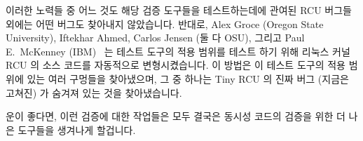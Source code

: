 이러한 노력들 중 어느 것도 해당 검증 도구들을 테스트하는데에 관여된 RCU 버그들
외에는 어떤 버그도 찾아내지 않았습니다.
반대로,
Alex Groce (Oregon State University), Iftekhar Ahmed, Carlos Jensen
(둘 다 OSU), 그리고 Paul E.~McKenney
(IBM)~\cite{Groce:2015:VMC:2916135.2916190}
는  테스트 도구의 적용 범위를 테스트 하기 위해 리눅스 커널 RCU
의 소스 코드를 자동적으로 변형시켰습니다.
이 방법은 이 테스트 도구의 적용 범위에 있는 여러 구멍들을 찾아냈으며, 그 중
하나는 Tiny RCU 의 진짜 버그 (지금은 고쳐진) 가 숨겨져 있는 것을 찾아냈습니다.

운이 좋다면, 이런 검증에 대한 작업들은 모두 결국은 동시성 코드의 검증을 위한 더
나은 도구들을 생겨나게 할겁니다.
\iffalse

None of these efforts located any bugs other than bugs injected into
RCU specifically to test the verification tools.
In contrast,
Alex Groce (Oregon State University), Iftekhar Ahmed, Carlos Jensen
(both also OSU), and Paul E.~McKenney
(IBM)~\cite{Groce:2015:VMC:2916135.2916190}
automatically mutated Linux-kernel RCU's source code to test the
coverage of the \co{rcutorture} test suite.
The effort found several holes in this suite's coverage, one of which
was hiding a real bug (since fixed) in Tiny RCU.

With some luck, all of this validation work will eventually result in
more and better tools for validating concurrent code.
\fi
